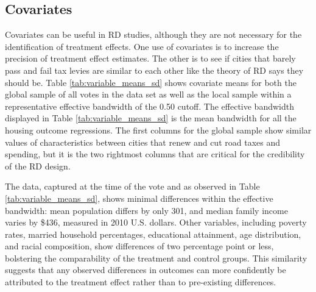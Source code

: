 \subsection{Covariates}

Covariates can be useful in RD studies, although they are not necessary for the identification of treatment effects.  One use of covariates is to increase the precision of treatment effect estimates.  The other is to see if cities that barely pass and fail tax levies are similar to each other like the theory of RD says they should be. Table \ref{tab:variable_means_sd} shows covariate means for both the global sample of all votes in the data set as well as the local sample within a representative effective bandwidth of the 0.50 cutoff. The effective bandwidth displayed in Table \ref{tab:variable_means_sd} is the mean bandwidth for all the housing outcome regressions. The first columns for the global sample show similar values of characteristics between cities that renew and cut road taxes and spending, but it is the two rightmost columns that are critical for the credibility of the RD design.   

The data, captured at the time of the vote and as observed in Table \ref{tab:variable_means_sd}, shows minimal differences within the effective bandwidth: mean population differs by only 301, and median family income varies by \$436, measured in 2010 U.S. dollars. Other variables, including poverty rates, married household percentages, educational attainment, age distribution, and racial composition, show differences of two percentage point or less, bolstering the comparability of the treatment and control groups. This similarity suggests that any observed differences in outcomes can more confidently be attributed to the treatment effect rather than to pre-existing differences.

